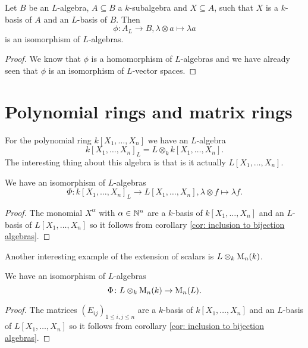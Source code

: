 \begin{cor}\label{cor: inclusion to bijection algebras}
 Let $B$ be an $L$-algebra, $A \subseteq B$ a $k$-subalgebra and $X \subseteq A$, such that $X$ is a $k$-basis of $A$ and an $L$-basis of $B$. Then
 \[
  \phi \colon A_L \to B, \lambda \otimes a \mapsto \lambda a
 \]
 is an isomorphism of $L$-algebras.
\end{cor}
\begin{proof}
 We know that $\phi$ is a homomorphism of $L$-algebras and we have already seen that $\phi$ is an isomorphism of $L$-vector spaces.
\end{proof}






\section{Polynomial rings and matrix rings}


For the polynomial ring $k[X_1, \dotsc, X_n]$ we have an $L$-algebra
\[
 k[X_1, \dotsc, X_n]_L = L \otimes_k k[X_1, \dotsc, X_n].
\]
The interesting thing about this algebra is that is it actually $L[X_1, \dotsc, X_n]$.


\begin{prop}
 We have an isomorphism of $L$-algebras
 \[
  \Phi \colon k[X_1, \dotsc, X_n]_L \to L[X_1, \dotsc, X_n], \lambda \otimes f \mapsto \lambda f.
 \]
\end{prop}
\begin{proof}
 The monomial $X^\alpha$ with $\alpha \in \mathbb{N}^n$ are a $k$-basis of $k[X_1, \dotsc, X_n]$ and an $L$-basis of $L[X_1, \dotsc, X_n]$ so it follows from corollary \ref{cor: inclusion to bijection algebras}.
\end{proof}


Another interesting example of the extension of scalars is $L \otimes_k \operatorname{M}_n(k)$.


\begin{prop}
 We have an isomorphism of $L$-algebras
 \[
  \Phi \colon L \otimes_k \operatorname{M}_n(k) \to \operatorname{M}_n(L).
 \]
\end{prop}
\begin{proof}
 The matrices $(E_{ij})_{1 \leq i,j \leq n}$ are a $k$-basis of $k[X_1, \dotsc, X_n]$ and an $L$-basis of $L[X_1, \dotsc, X_n]$ so it follows from corollary \ref{cor: inclusion to bijection algebras}.
\end{proof}





















